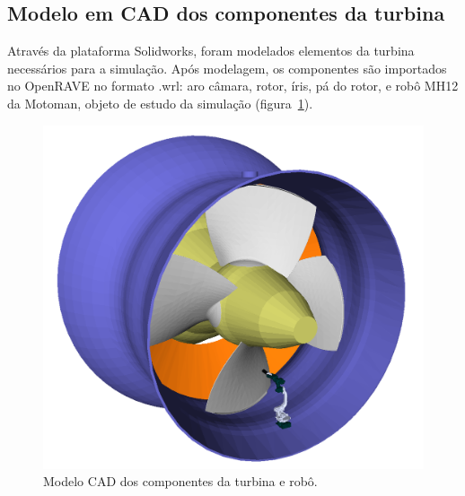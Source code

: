 \subsection{Modelo em CAD dos componentes da turbina}

Através da plataforma Solidworks, foram modelados elementos da turbina
necessários para a simulação. Após modelagem, os componentes são importados no
OpenRAVE no formato .wrl: aro câmara, rotor, íris, pá do rotor, e robô MH12 da
Motoman, objeto de estudo da simulação (figura~\ref{fig::arocamara}).

\begin{figure}[!ht]
	\centering	
	\includegraphics[width=.5\columnwidth]{figs/arocamara.png}
	\caption{Modelo CAD dos componentes da turbina e robô.}
	\label{fig::arocamara}
\end{figure}